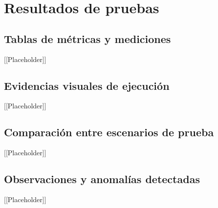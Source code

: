 \chapter{Resultados de pruebas}

\section{Tablas de métricas y mediciones}
[[Placeholder]]

\section{Evidencias visuales de ejecución}
[[Placeholder]]

\section{Comparación entre escenarios de prueba}
[[Placeholder]]

\section{Observaciones y anomalías detectadas}
[[Placeholder]]
